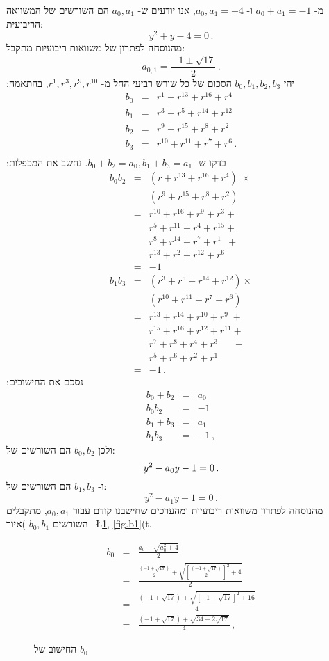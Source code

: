 \documentclass[11pt,a4paper]{article}
\newenvironment{form}[1]{%
\begin{displaymath}%
\renewcommand{\arraystretch}{#1}%
\begin{array}{lcl}}%
{\end{array}%
\end{displaymath}%
}
\newcommand*{\disfrac}[2]{\displaystyle\frac{#1}{#2}}
\begin{document}
מ-%
$a_0+a_1=-1$
ו-%
$a_0,a_1=-4$,
אנו יודעים ש-%
$a_0,a_1$
הם השורשים של המשוואה הריבועית:
\[
y^2+y-4=0\,.
\]
מהנוסחה לפתרון של משוואות ריבועיות מתקבל:
\[
a_{0,1} = \frac{-1\pm\sqrt{17}}{2}\,.
\]
יהי
$b_0,b_1,b_2,b_3$
הסכום של כל שורש רביעי החל מ-%
$r^1,r^3,r^9,r^{10}$,
בהתאמה:
\begin{form}{1.3}
b_0&=& r^1+ r^{13} + r^{16} + r^4\\
b_1&=& r^3+ r^{5} + r^{14} + r^{12}\\
b_2&=& r^9+ r^{15} + r^{8} + r^2\\
b_3&=& r^{10}+ r^{11} + r^{7} + r^6\,.\\
\end{form}
בדקו ש-%
$b_0+b_2=a_0, b_1+b_3=a_1$.
נחשב את המכפלות:
\begin{form}{1.3}
b_0b_2&=&(r + r^{13} + r^{16} +r^4)\;\times\\
&&(r^9 + r^{15} + r^{8} +r^{2})\\
&=& r^{10}+r^{16}+r^9+r^3+\\
&& r^{5}+r^{11}+r^4+r^{15}+\\
&& r^{8}+r^{14}+r^7+r^1\;\:+\\
&& r^{13}+r^{2}+r^{12}+r^6\\
&=&-1\\
b_1b_3&=&(r^3 + r^{5} + r^{14} +r^{12})\times\\
&&(r^{10} + r^{11} + r^{7} +r^{6})\\
&=& r^{13}+r^{14}+r^{10}+r^9\;+\\
&& r^{15}+r^{16}+r^{12}+r^{11}+\\
&& r^{7}+r^{8}+r^4+r^3\quad\;\;+\\
&& r^{5}+r^{6}+r^{2}+r^1\\
&=&-1\,.
\end{form}
נסכם את החישובים:
\begin{form}{1.2}
b_0+b_2&=&a_0\\
b_0b_2&=&-1\\
b_1+b_3&=&a_1\\
b_1b_3&=&-1\,,
\end{form}
ולכן
$b_0,b_2$ 
הם השורשים של:
\[
y^2-a_0y-1= 0\,.\\
\]
ו-%
$b_1,b_3$
הם השורשים של:
\[
y^2-a_1y-1 =0\,.
\]
מהנוסחה לפתרון משוואות ריבועיות ומהערכים שחישבנו קודם עבור 
$a_0,a_1$,
מתקבלים השורשים
$b_0,b_1$
)איור~%
\L{\ref{fig.b0}, \ref{fig.b1}}(t.
\begin{figure}[tb]
\begin{form}{2.6}
b_0&=&\disfrac{a_0+\sqrt{a_0^2+4}}{2}\\
&=&\disfrac{
     \disfrac{(-1+\sqrt{17})}{2} + 
     \sqrt{\left[\disfrac{(-1+\sqrt{17})}{2}\right]^2+4}
   }{2}\\
&=&\disfrac{
     (-1+\sqrt{17}) + 
     \sqrt{\left[-1+\sqrt{17}\right]^2+16}
   }{4}\\
&=&\disfrac{
     (-1+\sqrt{17}) + 
     \sqrt{34-2\sqrt{17}}
   }{4}\,,
\end{form}\vspace{-2em}
\caption{החישוב של $b_0$}\label{fig.b0}
\end{figure}
\end{document}
